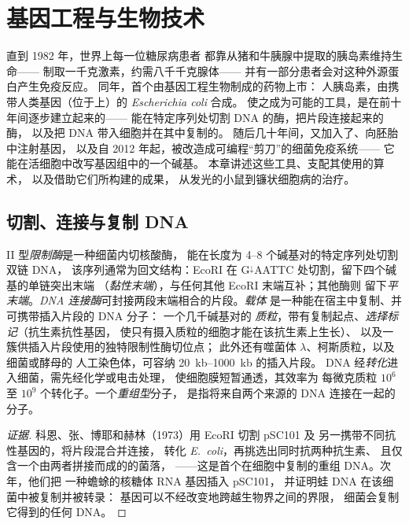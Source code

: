 \chapter{基因工程与生物技术}\label{ch:b3:genetic-engineering}

直到 1982 年，世界上每一位糖尿病患者
都靠从猪和牛胰腺中提取的胰岛素维持生命——
制取一千克激素，约需八千千克腺体——
并有一部分患者会对这种外源蛋白产生免疫反应。
同年，首个由基因工程生物制成的药物上市：
人胰岛素，由携带人类基因（位于上）的
\emph{Escherichia coli} 合成。
使之成为可能的工具，是在前十年间逐步建立起来的——
能在特定序列处切割 DNA 的酶，把片段连接起来的酶，
以及把 DNA 带入细胞并在其中复制的。
随后几十年间，又加入了、向胚胎中注射基因，
以及自 2012 年起，被改造成可编程“剪刀”的细菌免疫系统——
它能在活细胞中改写基因组中的一个碱基。
本章讲述这些工具、支配其使用的算术，
以及借助它们所构建的成果，
从发光的小鼠到镰状细胞病的治疗。

\section{切割、连接与复制 DNA}

\begin{definition}\label{def:b3:genetic-engineering:tools}
II 型\emph{限制酶}是一种细菌内切核酸酶，
能在长度为 \numrange{4}{8} 个碱基对的特定序列处切割双链 DNA，
该序列通常为回文结构：EcoRI 在
G$^{\downarrow}$AATTC 处切割，留下四个碱基的单链突出末端
（\emph{黏性末端}），与任何其他 EcoRI 末端互补；其他酶则
留下\emph{平末端}。\emph{DNA 连接酶}可封接两段末端相合的片段。\emph{载体}
是一种能在宿主中复制、并可携带插入片段的 DNA 分子：
一个几千碱基对的
\emph{质粒}，带有复制起点、\emph{选择标记}（抗生素抗性基因，
使只有摄入质粒的细胞才能在该抗生素上生长）、
以及一簇供插入片段使用的独特限制性酶切位点；
此外还有噬菌体 $\lambda$、柯斯质粒，以及细菌或酵母的
人工染色体，可容纳 \qtyrange{20}{1000}{kb} 的插入片段。
DNA 经\emph{转化}进入细菌，需先经化学或电击处理，
使细胞膜短暂通透，其效率为
每微克质粒 $10^{6}$ 至 $10^{9}$ 个转化子。一个\emph{重组型}分子，
是指将来自两个来源的 DNA 连接在一起的
分子。
\end{definition}

\begin{proof}[证据]
科恩、张、博耶和赫林（1973）用 EcoRI 切割 pSC101 及
另一携带不同抗性基因的，将片段混合并连接，
转化 \emph{E.~coli}，再挑选出同时抗两种抗生素、
且仅含一个由两者拼接而成的的菌落，
——这是首个在细胞中复制的重组 DNA。次年，他们把
一种蟾蜍的核糖体 RNA 基因插入 pSC101，
并证明蛙 DNA 在该细菌中被复制并被转录：
基因可以不经改变地跨越生物界之间的界限，
细菌会复制它得到的任何 DNA。
\end{proof}


